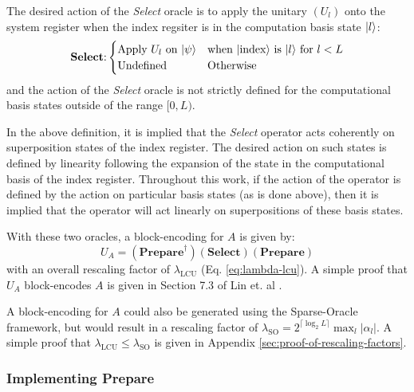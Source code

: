 The desired action of the \textit{Select} oracle is to apply the unitary $(U_l)$ onto the system register when the index regsiter is in the computation basis state $\ket{l}$:
\begin{equation}
    \label{eq:select}
    \textbf{Select}\text{:} 
    \begin{cases} 
        \text{Apply $U_l$ on $\ket{\psi}$} & \text{when $\ket{\text{index}}$ is $\ket{l}$ for $l < L$} \\
        \text{Undefined} & \text{Otherwise} \\
    \end{cases}
\end{equation}
and the action of the \textit{Select} oracle is not strictly defined for the computational basis states outside of the range $[0, L)$.

In the above definition, it is implied that the \textit{Select} operator acts coherently on superposition states of the index register.
The desired action on such states is defined by linearity following the expansion of the state in the computational basis of the index register.
Throughout this work, if the action of the operator is defined by the action on particular basis states (as is done above), then it is implied that the operator will act linearly on superpositions of these basis states. 

With these two oracles, a block-encoding for $A$ is given by:
\begin{equation}
    \label{eq:lcu-be}
    U_A = (\textbf{Prepare}^\dagger) (\textbf{Select}) (\textbf{Prepare})
\end{equation}
with an overall rescaling factor of $\lambda_\text{LCU}$ (Eq. \ref{eq:lambda-lcu}).
A simple proof that $U_A$ block-encodes $A$ is given in Section 7.3 of Lin et. al \cite{lin2022lecture}.

A block-encoding for $A$ could also be generated using the Sparse-Oracle framework, but would result in a rescaling factor of $\lambda_\text{SO} = 2^{\lceil \log_2L \rceil} \max_l |\alpha_l|$.
A simple proof that $\lambda_\text{LCU} \leq \lambda_\text{SO}$ is given in Appendix \ref{sec:proof-of-rescaling-factors}.

\subsubsection{Implementing \textbf{Prepare}}

